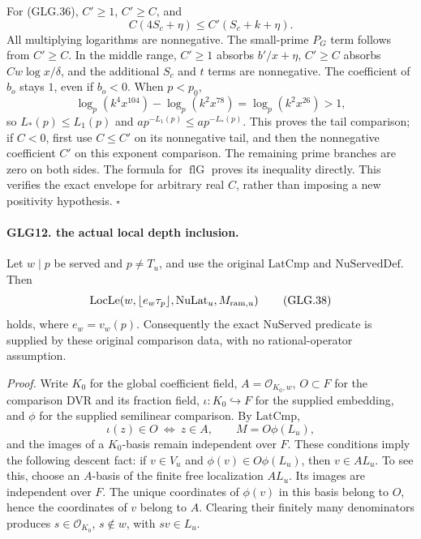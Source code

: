 \documentclass[11pt,a4paper]{article}
\numberwithin{equation}{section}
\theoremstyle{remark}\newtheorem{remark}[theorem]{Remark}
\begin{document}
For (GLG.36), \(C'\ge1\), \(C'\ge C\), and
\[
              C(4S_c+\eta)\le C'(S_c+k+\eta).
 \]
All multiplying logarithms are nonnegative.
The small-prime \(P_G\) term follows from \(C'\ge C\).
In the middle range, \(C'\ge1\) absorbs \(b'/x+\eta\),
\(C'\ge C\) absorbs \(Cw\log x/\delta\), and the
additional \(S_c\) and \(t\) terms are nonnegative.
The coefficient of \(b_o\) stays \(1\), even if \(b_o<0\).
When \(p<p_0\),
\[
 \log_p(k^4x^{104})-\log_p(k^2x^{78})
                       =\log_p(k^2x^{26})>1,
 \]
so \(L_*(p)\le L_1(p)\) and
\(ap^{-L_1(p)}\le ap^{-L_*(p)}\).
This proves the tail comparison; if \(C<0\), first use
\(C\le C'\) on its nonnegative tail, and then the
nonnegative coefficient \(C'\) on this exponent comparison.
The remaining prime branches are zero on both sides.
The formula for \(\operatorname{flG}\) proves its inequality
directly. This verifies the exact envelope for arbitrary
real \(C\), rather than imposing a new positivity hypothesis.
\hfill\(\square\)

\paragraph{GLG12. the actual local depth inclusion.}
\label{claim:GLG12}
Let \(w\mid p\) be served and \(p\ne T_u\), and use the
original \(\mathrm{LatCmp}\) and \(\mathrm{NuServedDef}\).
Then
\[
 \mathrm{LocLe}\!\left(w,\lfloor e_w\tau_p\rfloor,
                              \mathrm{NuLat}_u,M_{{\rm ram},u}\right)
                                                                    \tag{GLG.38}
\]
holds, where \(e_w=v_w(p)\). Consequently the exact
\(\mathrm{NuServed}\) predicate is supplied by these original
comparison data, with no rational-operator assumption.

\emph{Proof.}
Write \(K_0\) for the global coefficient field,
\(A=\mathcal O_{K_0,w}\), \(O\subset F\) for the comparison
DVR and its fraction field, \(\iota:K_0\hookrightarrow F\)
for the supplied embedding, and \(\phi\) for the supplied
semilinear comparison. By \(\mathrm{LatCmp}\),
\[
 \iota(z)\in O\ \Longleftrightarrow\ z\in A,\qquad
 M=O\phi(L_u),
 \]
and the images of a \(K_0\)-basis remain independent over \(F\).
These conditions imply the following descent fact:
if \(v\in V_u\) and \(\phi(v)\in O\phi(L_u)\), then
\(v\in A L_u\). To see this, choose an \(A\)-basis of
the finite free localization \(A L_u\). Its images are
independent over \(F\). The unique coordinates of
\(\phi(v)\) in this basis belong to \(O\), hence the
coordinates of \(v\) belong to \(A\). Clearing their
finitely many denominators produces \(s\in\mathcal O_{K_0}\),
\(s\notin w\), with \(sv\in L_u\).
\end{document}
